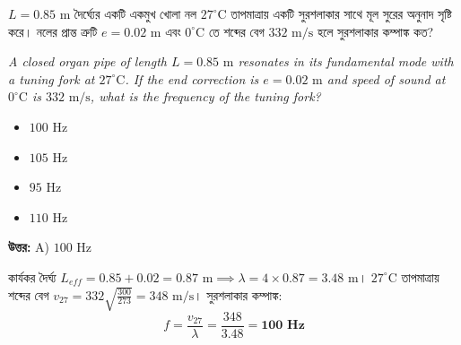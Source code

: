\documentclass[12pt, a4paper]{article}
\begin{document}
\begin{tcolorbox}[questionbox={প্রশ্ন (Question) 7}]
    \noindent
    $L = 0.85\text{ m}$ দৈর্ঘ্যের একটি একমুখ খোলা নল $27^\circ\text{C}$ তাপমাত্রায় একটি সুরশলাকার সাথে মূল সুরের অনুনাদ সৃষ্টি করে। নলের প্রান্ত ত্রুটি $e = 0.02\text{ m}$ এবং $0^\circ\text{C}$ তে শব্দের বেগ $332\text{ m/s}$ হলে সুরশলাকার কম্পাঙ্ক কত?
    
    \vspace{0.8em}
    \begin{english}
    \noindent\textit{\color{darkgray}
    A closed organ pipe of length $L = 0.85\text{ m}$ resonates in its fundamental mode with a tuning fork at $27^\circ\text{C}$. If the end correction is $e = 0.02\text{ m}$ and speed of sound at $0^\circ\text{C}$ is $332\text{ m/s}$, what is the frequency of the tuning fork?
    }
    \end{english}
\end{tcolorbox}

\begin{itemize}[label={}, leftmargin=1cm, itemsep=0.5em]
    \item[\textbf{A)}] $100\text{ Hz}$
    \item[\textbf{B)}] $105\text{ Hz}$
    \item[\textbf{C)}] $95\text{ Hz}$
    \item[\textbf{D)}] $110\text{ Hz}$
\end{itemize}

\vspace{0.5em}
\begin{tcolorbox}[answerbox]
    \textbf{\color{success} উত্তর:} A) $100\text{ Hz}$
\end{tcolorbox}
\vspace{1em}

\begin{tcolorbox}[solutionbox={সমাধান (Solution)}]
    \noindent
    কার্যকর দৈর্ঘ্য $L_{eff} = 0.85 + 0.02 = 0.87\text{ m} \implies \lambda = 4 \times 0.87 = 3.48\text{ m}$। $27^\circ\text{C}$ তাপমাত্রায় শব্দের বেগ $v_{27} = 332 \sqrt{\frac{300}{273}} = 348\text{ m/s}$। সুরশলাকার কম্পাঙ্ক:
    \[ f = \frac{v_{27}}{\lambda} = \frac{348}{3.48} = \mathbf{100\text{ Hz}} \]
\end{tcolorbox}

\vspace{2em}
\end{document}
